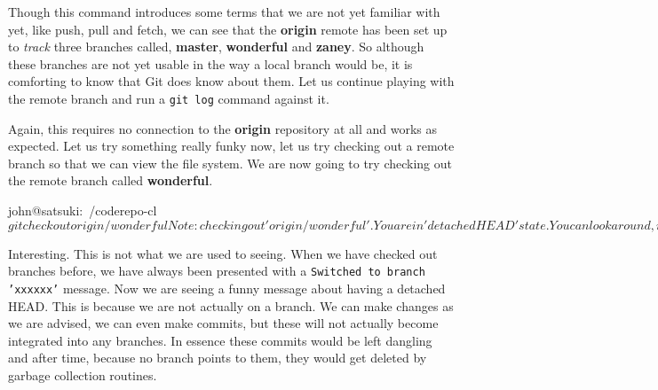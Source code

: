 Though this command introduces some terms that we are not yet familiar with yet, like push, pull and fetch, we can see that the \textbf{origin} remote has been set up to \emph{track} three branches called, \textbf{master}, \textbf{wonderful} and \textbf{zaney}.
So although these branches are not yet usable in the way a local branch would be, it is comforting to know that Git does know about them.
Let us continue playing with the remote branch and run a \texttt{git log} command against it.


Again, this requires no connection to the \textbf{origin} repository at all and works as expected.
Let us try something really funky now, let us try checking out a remote branch so that we can view the file system.
We are now going to try checking out the remote branch called \textbf{wonderful}.

\begin{code}
john@satsuki:~/coderepo-cl$ git checkout origin/wonderful
Note: checking out 'origin/wonderful'.

You are in 'detached HEAD' state. You can look around, make experimental
changes and commit them, and you can discard any commits you make in this 
state without impacting any branches by performing another checkout.

If you want to create a new branch to retain commits you create, you may
do so (now or later) by using -b with the checkout command again. Example:

  git checkout -b new_branch_name

HEAD is now at cfbecab... Fantastic new feature
john@satsuki:~/coderepo-cl$
\end{code}

Interesting.
This is not what we are used to seeing.
When we have checked out branches before, we have always been presented with a \texttt{Switched to branch 'xxxxxx'} message.
Now we are seeing a funny message about having a detached HEAD.
This is because we are not actually on a branch.
We can make changes as we are advised, we can even make commits, but these will not actually become integrated into any branches.
In essence these commits would be left dangling and after time, because no branch points to them, they would get deleted by garbage collection routines.

